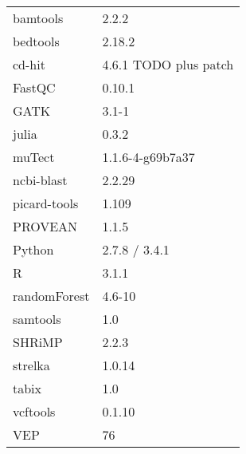 \documentclass[11pt,a4paper]{report}
\begin{document}
\begin{tabular}{ll}
\toprule
  bamtools                    & 2.2.2 \\
  bedtools                    & 2.18.2 \\
  cd-hit                      & 4.6.1 TODO plus patch \\
  FastQC                      & 0.10.1 \\
  GATK                        & 3.1-1 \\
  julia                       & 0.3.2 \\
  muTect                      & 1.1.6-4-g69b7a37 \\
  ncbi-blast                  & 2.2.29 \\
  picard-tools                & 1.109 \\
  PROVEAN                     & 1.1.5 \\
  Python                      & 2.7.8 / 3.4.1 \\
  R                           & 3.1.1 \\
  \quad randomForest          & 4.6-10 \\
  samtools                    & 1.0 \\
  SHRiMP                      & 2.2.3 \\
  strelka                     & 1.0.14 \\
  tabix                       & 1.0 \\
  vcftools                    & 0.1.10 \\
  VEP                         & 76 \\
\bottomrule
\end{tabular}









\end{document}
